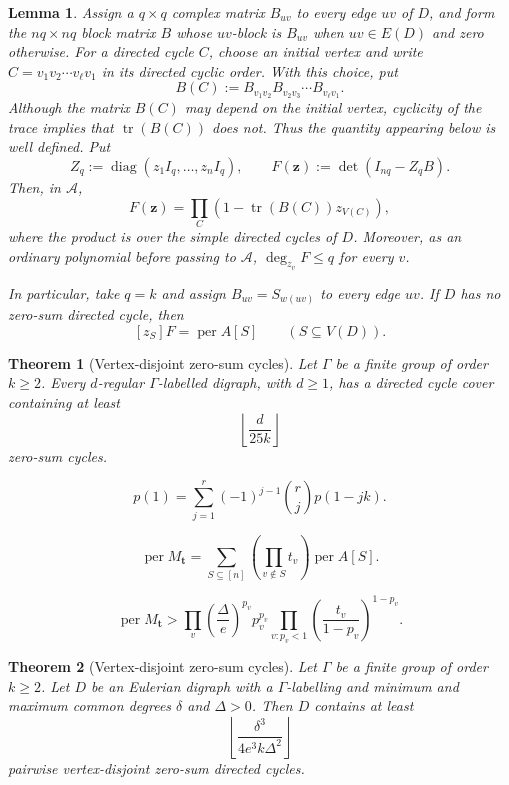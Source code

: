 \documentclass[10pt,a4paper]{amsart}
\newtheorem{lemma}{Lemma}
\newtheorem{theorem}{Theorem}
\newcommand{\diag}{\operatorname{diag}}
\newcommand{\per}{\operatorname{per}}
\newcommand{\tr}{\operatorname{tr}}
\begin{document}
\begin{lemma}\label{lem:cycle-product}
Assign a $q\times q$ complex matrix $B_{uv}$ to every edge $uv$ of
$D$, and form the $nq\times nq$ block matrix $B$ whose $uv$-block is
$B_{uv}$ when $uv\in E(D)$ and zero otherwise.  For a directed cycle
$C$, choose an initial vertex and write
$C=v_1v_2\cdots v_\ell v_1$ in its directed cyclic order.  With this
choice, put
\[
  B(C):=B_{v_1v_2}B_{v_2v_3}\cdots B_{v_\ell v_1}.
\]
Although the matrix $B(C)$ may depend on the initial vertex, cyclicity
of the trace implies that $\tr(B(C))$ does not.  Thus the quantity
appearing below is well defined.  Put
\[
  Z_q:=\diag(z_1I_q,\ldots,z_nI_q),
  \qquad
  F(\mathbf z):=\det(I_{nq}-Z_qB).
\]
Then, in $\mathcal A$,
\[
  F(\mathbf z)
  =
  \prod_C
  \left(1-\tr(B(C))z_{V(C)}\right),
\]
where the product is over the simple directed cycles of $D$.
Moreover, as an ordinary polynomial before passing to $\mathcal A$,
$\deg_{z_v}F\le q$ for every $v$.

In particular, take $q=k$ and assign $B_{uv}=S_{w(uv)}$ to every edge
$uv$.  If $D$ has no zero-sum directed cycle, then
\[
  [z_S]F=\per A[S]
  \qquad(S\subseteq V(D)).
\]
\end{lemma}

\begin{theorem}[Vertex-disjoint zero-sum cycles]
\label{thm:vertex-packing}
Let $\Gamma$ be a finite group of order $k\ge2$.  Every $d$-regular
$\Gamma$-labelled digraph, with $d\ge1$, has a directed cycle cover
containing at least
\[
  \left\lfloor\frac{d}{25k}\right\rfloor
\]
zero-sum cycles.
\end{theorem}

\begin{equation}\label{eq:cover-finite-difference}
  p(1)
  =
  \sum_{j=1}^r(-1)^{j-1}\binom rj p(1-jk).
\end{equation}

\begin{equation}\label{eq:weighted-permanent-expansion}
  \per M_{\mathbf t}
  =
  \sum_{S\subseteq[n]}
  \left(\prod_{v\notin S}t_v\right)\per A[S].
\end{equation}

\begin{equation}\label{eq:bethe-lower}
  \per M_{\mathbf t}
  >
  \prod_v
  \left(\frac{\Delta}{e}\right)^{p_v}p_v^{p_v}
  \prod_{v:p_v<1}
  \left(\frac{t_v}{1-p_v}\right)^{1-p_v}.
\end{equation}

\begin{theorem}[Vertex-disjoint zero-sum cycles]
\label{thm:eulerian-vertex-packing}
Let $\Gamma$ be a finite group of order $k\ge2$.  Let $D$ be an
Eulerian digraph with a $\Gamma$-labelling and minimum and maximum
common degrees $\delta$ and $\Delta>0$.  Then $D$ contains at least
\[
  \left\lfloor\frac{\delta^3}{4e^3k\Delta^2}\right\rfloor
\]
pairwise vertex-disjoint zero-sum directed cycles.
\end{theorem}
\end{document}
